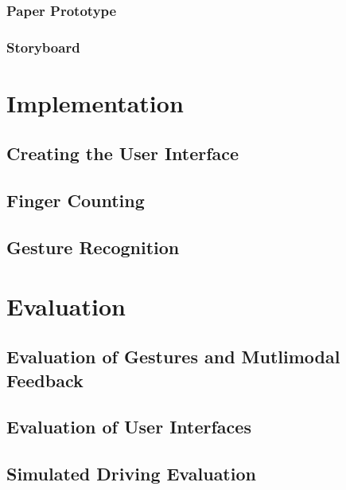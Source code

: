 \documentclass{l4proj}
\begin{document}
\subsection{Paper Prototype}
\vspace{-3mm}
\subsection{Storyboard}
\vspace{-3mm}

\chapter{Implementation}
\label{sec:implementation}
\vspace{-3mm}
\section{Creating the User Interface}
\vspace{-3mm}
\section{Finger Counting}
\vspace{-3mm}
\section{Gesture Recognition}
\vspace{-3mm}

\chapter{Evaluation}
\vspace{-3mm}
\section{Evaluation of Gestures and Mutlimodal Feedback}
\vspace{-3mm}
\section{Evaluation of User Interfaces}
\vspace{-3mm}
\section{Simulated Driving Evaluation}
\vspace{-3mm}
\end{document}
